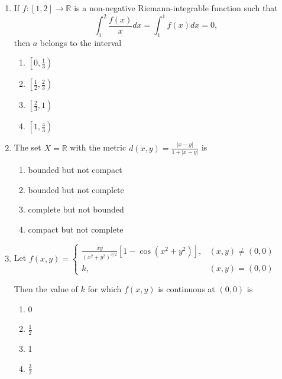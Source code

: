 \documentclass[journal]{IEEEtran}
\numberwithin{equation}{enumi}
\numberwithin{figure}{enumi}
\begin{document}
\begin{enumerate}
    \item If $f : [1, 2] \rightarrow \mathbb{R}$ is a non-negative Riemann-integrable function such that
    \[
    \int_1^2 \frac{f(x)}{x} dx = \int_1^1 f(x) dx = 0,
    \]
    then $a$ belongs to the interval

    \begin{multicols}{4}
    \begin{enumerate}
        \item $\left[0, \frac{1}{3}\right)$
        \item $\left[\frac{1}{2}, \frac{2}{3}\right)$
        \item $\left[\frac{2}{3}, 1\right)$
        \item $\left[1, \frac{4}{3}\right)$
    \end{enumerate}
    \end{multicols}
    \item The set $X = \mathbb{R}$ with the metric $d(x, y) = \frac{|x - y|}{1 + |x - y|}$ is
    \begin{multicols}{2}
    \begin{enumerate}
        \item bounded but not compact
        \item bounded but not complete
        \item complete but not bounded
        \item compact but not complete
    \end{enumerate}
    \end{multicols}

    \item Let $f(x, y) = 
    \begin{cases} 
        \frac{xy}{\left(x^2 + y^2\right)^{3/2}} \left[1 - \cos(x^2 + y^2)\right], & (x, y) \neq (0,0) \\ 
        k, & (x, y) = (0,0) 
    \end{cases}$

    Then the value of $k$ for which $f(x, y)$ is continuous at $(0,0)$ is
    \begin{multicols}{4}
    \begin{enumerate}
        \item 0
        \item $\frac{1}{2}$
        \item 1
        \item $\frac{3}{2}$
    \end{enumerate}
    \end{multicols}


\end{enumerate}
\end{document}
